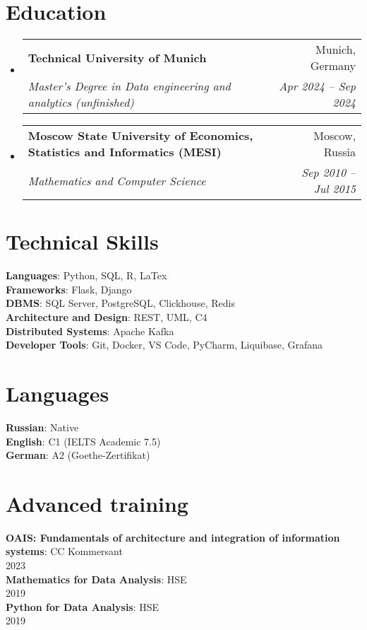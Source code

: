 \documentclass[letterpaper,11pt,english,russian]{article}
\newcommand{\resumeSubheading}[4]{
  \vspace{-2pt}\item
    \begin{tabularx}{0.95\textwidth}[t]{X r}
      \textbf{#1} & #2 \\
      \textit{\small #3} & \textit{\small #4} \\
    \end{tabularx}\vspace{-7pt}
}
\newcommand{\resumeSubHeadingListStart}{\begin{itemize}[leftmargin=0.15in, label={}]}
\newcommand{\resumeSubHeadingListEnd}{\end{itemize}}
\begin{document}
\section{Education}
  \resumeSubHeadingListStart
    \resumeSubheading
      {Technical University of Munich}{Munich, Germany}
      {Master's Degree in Data engineering and analytics (unfinished)}{Apr 2024 -- Sep 2024}
    \resumeSubheading
      {Moscow State University of Economics, Statistics and Informatics (MESI) }{Moscow, Russia}
      {Mathematics and Computer Science}{Sep 2010 -- Jul 2015}
  \resumeSubHeadingListEnd


%
\section{Technical Skills}
 \begin{itemize}[leftmargin=0.15in, label={}]
    \small{\item{
     \textbf{Languages}{: Python, SQL, R, LaTex} \\
     \textbf{Frameworks}{: Flask, Django} \\
     \textbf{DBMS}{: SQL Server, PostgreSQL, Clickhouse, Redis} \\
     \textbf{Architecture and Design}{: REST, UML, C4}\\
     \textbf{Distributed Systems}{: Apache Kafka} \\
     \textbf{Developer Tools}{: Git, Docker, VS Code, PyCharm, Liquibase, Grafana}
    }}
 \end{itemize}

%
\section{Languages}
 \begin{itemize}[leftmargin=0.15in, label={}]
    \small{\item{
     \textbf{Russian}{: Native} \\
     \textbf{English}{: C1 (IELTS Academic 7.5)} \\
     \textbf{German}{: A2 (Goethe-Zertifikat)}
    }}
 \end{itemize}

\section{Advanced training}
 \begin{itemize}[leftmargin=0.15in, label={}]
    \small{\item{
     \textbf{OAIS: Fundamentals of architecture and integration of information systems}{: CC Kommersant\\ 2023} \\
     \textbf{Mathematics for Data Analysis}{: HSE\\ 2019} \\
     \textbf{Python for Data Analysis}{: HSE\\ 2019}
    }}
 \end{itemize}


\end{document}
